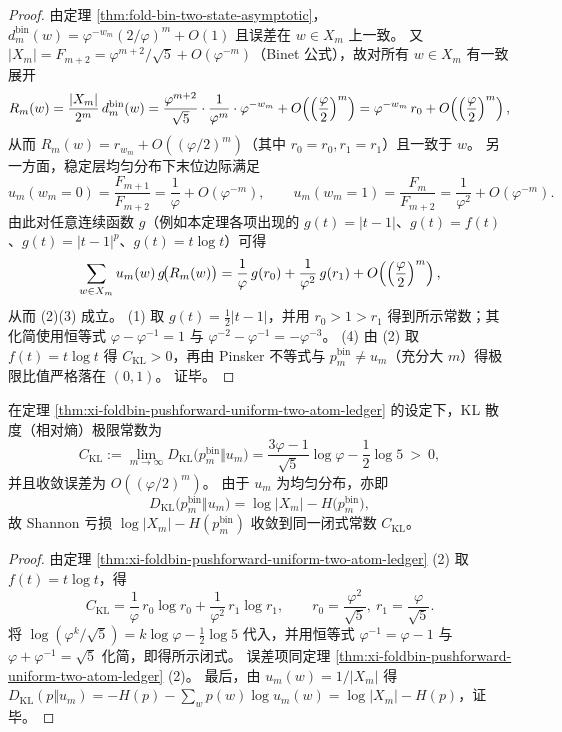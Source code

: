 \begin{proof}
由定理 \ref{thm:fold-bin-two-state-asymptotic}，
\(
d^{\mathrm{bin}}_m(w)=\varphi^{-w_m}(2/\varphi)^m+O(1)
\)
且误差在 \(w\in X_m\) 上一致。
又 \(|X_m|=F_{m+2}=\varphi^{m+2}/\sqrt5+O(\varphi^{-m})\)（Binet 公式），故对所有 \(w\in X_m\) 有一致展开
\[
R_m(w)
=\frac{|X_m|}{2^m}\,d^{\mathrm{bin}}_m(w)
=\frac{\varphi^{m+2}}{\sqrt5}\cdot\frac{1}{\varphi^m}\cdot\varphi^{-w_m}+O\!\left(\Bigl(\frac{\varphi}{2}\Bigr)^m\right)
=\varphi^{-w_m}\,r_0+O\!\left(\Bigl(\frac{\varphi}{2}\Bigr)^m\right),
\]
从而 \(R_m(w)=r_{w_m}+O((\varphi/2)^m)\)（其中 \(r_{0}=r_0,r_{1}=r_1\)）且一致于 \(w\)。
另一方面，稳定层均匀分布下末位边际满足
\[
u_m(w_m=0)=\frac{F_{m+1}}{F_{m+2}}=\frac{1}{\varphi}+O(\varphi^{-m}),
\qquad
u_m(w_m=1)=\frac{F_{m}}{F_{m+2}}=\frac{1}{\varphi^2}+O(\varphi^{-m}).
\]
由此对任意连续函数 \(g\)（例如本定理各项出现的 \(g(t)=|t-1|\)、\(g(t)=f(t)\)、\(g(t)=|t-1|^p\)、\(g(t)=t\log t\)）可得
\[
\sum_{w\in X_m}u_m(w)\,g\!\bigl(R_m(w)\bigr)
=\frac{1}{\varphi}\,g(r_0)+\frac{1}{\varphi^2}\,g(r_1)+O\!\left(\Bigl(\frac{\varphi}{2}\Bigr)^m\right),
\]
从而 (2)(3) 成立。
(1) 取 \(g(t)=\frac12|t-1|\)，并用 \(r_0>1>r_1\) 得到所示常数；其化简使用恒等式
\(
\varphi-\varphi^{-1}=1
\)
与
\(
\varphi^{-2}-\varphi^{-1}=-\varphi^{-3}
\)。
(4) 由 (2) 取 \(f(t)=t\log t\) 得 \(C_{\mathrm{KL}}>0\)，再由 Pinsker 不等式与 \(p^{\mathrm{bin}}_m\neq u_m\)（充分大 \(m\)）得极限比值严格落在 \((0,1)\)。
证毕。
\end{proof}


\begin{corollary}\label{cor:xi-foldbin-shannon-deficit-constant-closed-form}
在定理 \ref{thm:xi-foldbin-pushforward-uniform-two-atom-ledger} 的设定下，KL 散度（相对熵）极限常数为
\[
C_{\mathrm{KL}}
:=\lim_{m\to\infty}D_{\mathrm{KL}}\bigl(p^{\mathrm{bin}}_m\Vert u_m\bigr)
=\frac{3\varphi-1}{\sqrt5}\log\varphi-\frac12\log 5\ >\ 0,
\]
并且收敛误差为 \(O((\varphi/2)^m)\)。
由于 \(u_m\) 为均匀分布，亦即
\[
D_{\mathrm{KL}}\bigl(p^{\mathrm{bin}}_m\Vert u_m\bigr)=\log|X_m|-H\bigl(p^{\mathrm{bin}}_m\bigr),
\]
故 Shannon 亏损 \(\log|X_m|-H(p^{\mathrm{bin}}_m)\) 收敛到同一闭式常数 \(C_{\mathrm{KL}}\)。
\end{corollary}
\begin{proof}
由定理 \ref{thm:xi-foldbin-pushforward-uniform-two-atom-ledger} (2) 取 \(f(t)=t\log t\)，得
\[
C_{\mathrm{KL}}
=\frac{1}{\varphi}\,r_0\log r_0+\frac{1}{\varphi^2}\,r_1\log r_1,
\qquad
r_0=\frac{\varphi^2}{\sqrt5},\ r_1=\frac{\varphi}{\sqrt5}.
\]
将 \(\log(\varphi^k/\sqrt5)=k\log\varphi-\tfrac12\log 5\) 代入，并用恒等式
\(\varphi^{-1}=\varphi-1\) 与 \(\varphi+\varphi^{-1}=\sqrt5\) 化简，即得所示闭式。
误差项同定理 \ref{thm:xi-foldbin-pushforward-uniform-two-atom-ledger} (2)。
最后，由 \(u_m(w)=1/|X_m|\) 得
\(
D_{\mathrm{KL}}(p\Vert u_m)=-H(p)-\sum_w p(w)\log u_m(w)=\log|X_m|-H(p)
\)，证毕。
\end{proof}

